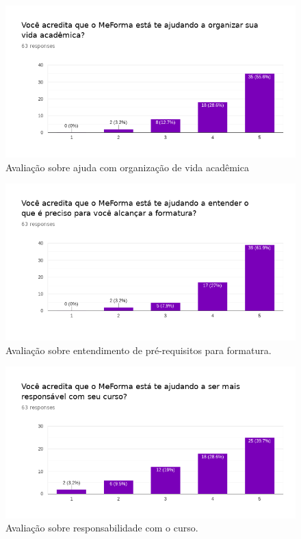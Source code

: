 \begin{figure}[H]
	   \centering
	   		\includegraphics[scale=0.65]{pics/c5/0-organize.png}
	   \caption{Avaliação sobre ajuda com organização de vida acadêmica}
	   \label{organize}
\end{figure}
\begin{figure}[H]
	   \centering
	   		\includegraphics[scale=0.65]{pics/c5/1-graduate.png}
	   \caption{Avaliação sobre entendimento de pré-requisitos para formatura.}
	   \label{graduate}
\end{figure}
\begin{figure}[H]
	   \centering
	   		\includegraphics[scale=0.65]{pics/c5/2-responsability.png}
	   \caption{Avaliação sobre responsabilidade com o curso.}
	   \label{responsability}
\end{figure}

